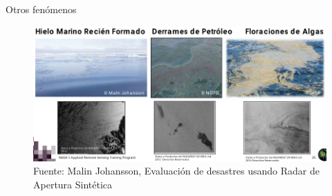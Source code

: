 \begin{frame}{Otros fenómenos}
    \begin{figure}
        \centering
        \includegraphics[scale=0.35]{img/section_03/oil_slick_03}
        \caption{Fuente: Malin Johansson, Evaluación de desastres usando Radar de Apertura Sintética}
        \label{fig:section_03_dinamica_sar_petroleo}
    \end{figure}
\end{frame}

